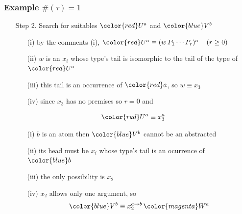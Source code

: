 \begin{frame}
\frametitle{Example $\#(\tau) = 1$} 
\begin{itemize}
 \item[Step 2.] Search for suitables ${\color{red}U^a}$ and ${\color{blue}V^b}$\\[0.3cm]
 
 \begin{itemize}
  \item[(i)] by the comments (i), ${\color{red}U^a} \equiv (w\,P_1 \cdots P_r)^a \,\,\,\,\,\,\, (r \geq 0)$
  \item[(ii)]$w$ is an $x_i$ whose type's tail is isomorphic to the tail of the type of ${\color{red}U^a}$
  \item[(iii)] this tail is an occurrence of ${\color{red}a}$, so $w \equiv x_3$
  \item[(iv)] since $x_3$ has no premises so $r = 0$ and \\[0.3cm]
 \end{itemize}
\begin{equation}
 {\color{red}U^a} \equiv x_3^a
\end{equation}
  \begin{itemize}
   \item[(i)] $b$ is an atom then ${\color{blue}V^b}$ cannot be an abstracted
   \item[(ii)] its head must be $x_i$ whose type's tail is an ocurrence of ${\color{blue}b}$
   \item[(iii)] the only possibility is $x_2$
   \item[(iv)] $x_2$ allows only one argument, so \\[0.3cm]
\begin{equation}
 {\color{blue}V^b} \equiv x_2^{a \to b} \, {\color{magenta}W^a}
\end{equation}
  \end{itemize}
\end{itemize}
 
\end{frame}

